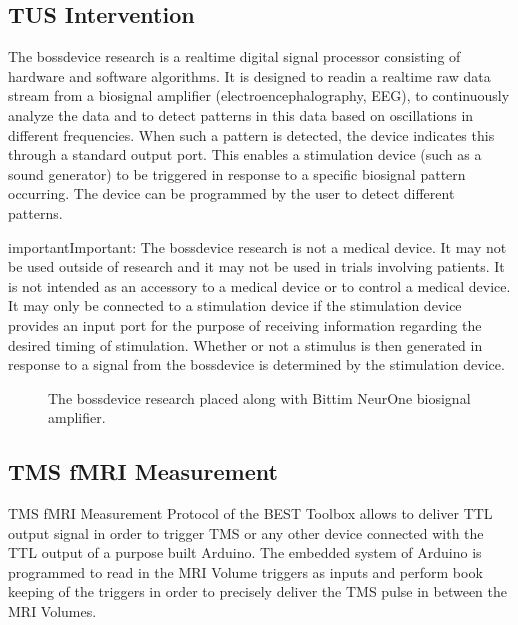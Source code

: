 \documentclass[letterpaper,10pt,english]{sphinxmanual}
\begin{document}
\subsection{TUS Intervention}
\label{\detokenize{13_TUSIntervention:tus-intervention}}\label{\detokenize{13_TUSIntervention::doc}}
\sphinxAtStartPar
The bossdevice research is a real\sphinxhyphen{}time digital signal processor consisting of hardware and software algorithms. It is designed to read\sphinxhyphen{}in a real\sphinxhyphen{}time raw data stream from a biosignal amplifier (electroencephalography, EEG), to continuously analyze the data and to detect patterns in this data based on oscillations in different frequencies. When such a pattern is detected, the device indicates this through a standard output port. This enables a stimulation device (such as a sound generator) to be triggered in response to a specific biosignal pattern occurring. The device can be programmed by the user to detect different patterns.

\begin{sphinxadmonition}{important}{Important:}
\sphinxAtStartPar
The bossdevice research is not a medical device. It may not be used outside of research and it may not be used in trials involving patients. It is not intended as an accessory to a medical device or to control a medical device. It may only be connected to a stimulation device if the stimulation device provides an input port for the purpose of receiving information regarding the desired timing of stimulation. Whether or not a stimulus is then generated in response to a signal from the bossdevice is determined by the stimulation device.
\end{sphinxadmonition}

\begin{figure}[htbp]
\centering
\capstart

\noindent{}
\caption{The bossdevice research placed along with Bittim NeurOne biosignal amplifier.}\label{\detokenize{13_TUSIntervention:id1}}\end{figure}


\subsection{TMS fMRI Measurement}
\label{\detokenize{14_TMSfMRIMeasurement:tms-fmri-measurement}}\label{\detokenize{14_TMSfMRIMeasurement::doc}}
\sphinxAtStartPar
TMS fMRI Measurement Protocol of the BEST Toolbox allows to deliver TTL output signal in order to trigger TMS or any other device connected with the TTL output of a purpose built Arduino. The embedded system of Arduino is programmed to read in the MRI Volume triggers as inputs and perform book keeping of the triggers in order to precisely deliver the TMS pulse in between the MRI Volumes.
\end{document}
